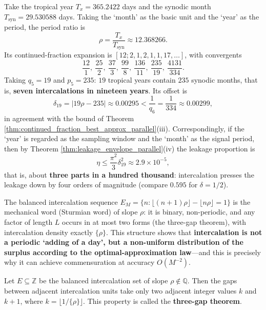 \begin{example}\label{ex:metonic_parallel}
Take the tropical year $T_x=365.2422$ days and the synodic month $T_{\mathrm{syn}}=29.530588$ days. Taking the `month' as the basic unit and the `year' as the period, the period ratio is
\[
\rho=\frac{T_x}{T_{\mathrm{syn}}}\approx12.368266 .
\]
Its continued-fraction expansion is $[12;2,1,2,1,1,17,\dots]$, with convergents
\[
\frac{12}{1},\ \frac{25}{2},\ \frac{37}{3},\ \frac{99}{8},\ \frac{136}{11},\ \frac{235}{19},\ \frac{4131}{334}.
\]
Taking $q_5=19$ and $p_5=235$: $19$ tropical years contain $235$ synodic months, that is, \textbf{seven intercalations in nineteen years}. Its offset is
\[
\delta_{19}=|19\rho-235|\approx0.00295<\frac1{q_6}=\frac1{334}\approx0.00299,
\]
in agreement with the bound of Theorem \ref{thm:continued_fraction_best_approx_parallel}(iii). Correspondingly, if the `year' is regarded as the sampling window and the `month' as the signal period, then by Theorem \ref{thm:leakage_envelope_parallel}(iv) the leakage proportion is
\[
\eta\le\frac{\pi^2}{3}\delta_{19}^2\approx2.9\times10^{-5},
\]
that is, about \textbf{three parts in a hundred thousand}: intercalation presses the leakage down by four orders of magnitude (compare $0.595$ for $\delta=1/2$).
\end{example}

\begin{remark}\label{rem:intercalation_sturmian}
The balanced intercalation sequence $E_M=\{n:\lfloor(n+1)\rho\rfloor-\lfloor n\rho\rfloor=1\}$ is the mechanical word (Sturmian word) of slope $\rho$: it is binary, non-periodic, and any factor of length $L$ occurs in at most two forms (the three-gap theorem), with intercalation density exactly $\{\rho\}$. This structure shows that \textbf{intercalation is not a periodic `adding of a day', but a non-uniform distribution of the surplus according to the optimal-approximation law}---and this is precisely why it can achieve commensuration at accuracy $O(M^{-2})$.
\end{remark}

\begin{property}\label{prop:sturmian_three_gap}
Let $E\subseteq\mathbb{Z}$ be the balanced intercalation set of slope $\rho\notin\mathbb{Q}$. Then the gaps between adjacent intercalation units take only two adjacent integer values $k$ and $k+1$, where $k=\lfloor 1/\{\rho\}\rfloor$. This property is called the \textbf{three-gap theorem}.
\end{property}

